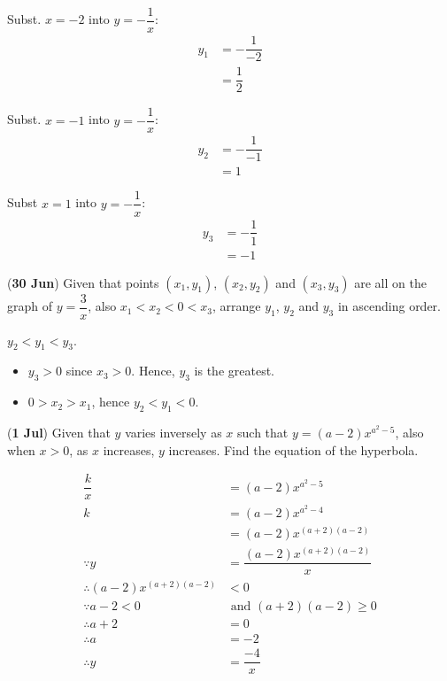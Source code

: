 \documentclass[12pt, answers]{exam}
\renewcommand{\frac}[2]{\dfrac{#1}{#2}}
\newcommand{\oneover}[1]{\dfrac{1}{#1}}
\newcommand{\qndate}[2]{(\textbf{#1 #2})}
\begin{document}
\begin{questions}
\begin{solution}
		Subst. $x = -2$ into $y=-\oneover{x}$:
		\begin{align*}
			y_1 & = -\oneover{-2} \\
			    & = \oneover{2}
		\end{align*}

		Subst. $x=-1$ into $y=-\oneover{x}$:
		\begin{align*}
			y_2 & = -\oneover{-1} \\
			    & = 1
		\end{align*}

		Subst $x=1$ into $y=-\oneover{x}$:
		\begin{align*}
			y_3 & = -\oneover{1} \\
			    & = -1
		\end{align*}
	\end{solution}


	\question \qndate{30}{Jun} Given that points $\left(x_1,y_1\right)$, $\left(x_2,y_2\right)$
	and $\left(x_3,y_3\right)$ are all on the graph of $y=\frac{3}{x}$, also
	$x_1<x_2<0<x_3$, arrange $y_1$, $y_2$ and $y_3$ in ascending order.
	\begin{solution}
		$y_2<y_1<y_3$.
		\begin{itemize}
			\item $y_3 > 0$ since $x_3 > 0$. Hence, $y_3$ is the greatest.
			\item $0 > x_2 > x_1$, hence $y_2 < y_1 < 0$.
		\end{itemize}
	\end{solution}

	\question \qndate{1}{Jul} Given that $y$ varies inversely as $x$ such that
	$y = \left(a-2\right){x}^{a^2-5}$, also when $x>0$, as $x$ increases, $y$
	increases. Find the equation of the hyperbola.
	\begin{solution}
		\begin{align*}
			\frac{k}{x}                                 & = \left(a-2\right){x}^{a^2-5}                \\
			k                                           & = \left(a-2\right){x}^{a^2-4}                \\
			                                            & = \left(a-2\right){x}^{(a+2)(a-2)}           \\
			\because y                                  & = \frac{\left(a-2\right){x}^{(a+2)(a-2)}}{x} \\
			\therefore \left(a-2\right){x}^{(a+2)(a-2)} & < 0                                          \\
			\because a - 2 < 0                          & \text{ and } (a+2)(a-2) \geq 0               \\
			\therefore a + 2                            & = 0                                          \\
			\therefore a                                & = -2                                         \\
			\therefore y                                & = \frac{-4}{x}                               \\
		\end{align*}
	\end{solution}


\end{questions}
\end{document}
